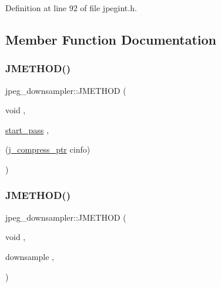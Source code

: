 Definition at line 92 of file jpegint.\+h.



\subsection{Member Function Documentation}
\mbox{\label{structjpeg__downsampler_a1ca33229e63cdb80020c714f1cd28ea0}} 
\subsubsection{\texorpdfstring{JMETHOD()}{JMETHOD()}\hspace{0.1cm}{\footnotesize\ttfamily [1/2]}}
{\footnotesize\ttfamily jpeg\+\_\+downsampler\+::\+J\+M\+E\+T\+H\+OD (\begin{DoxyParamCaption}\item[{void}]{,  }\item[{\mbox{\hyperlink{jddctmgr_8c_a1964f006adb8fb80f57e455f6452aec1}{start\+\_\+pass}}}]{,  }\item[{(\mbox{\hyperlink{jpeglib_8h_add2a072c54e3a51550f4975f7ddb91e7}{j\+\_\+compress\+\_\+ptr}} cinfo)}]{ }\end{DoxyParamCaption})}

\mbox{\label{structjpeg__downsampler_a611ebcb0ae11e4d1c6ba4222caacaec4}} 
\subsubsection{\texorpdfstring{JMETHOD()}{JMETHOD()}\hspace{0.1cm}{\footnotesize\ttfamily [2/2]}}
{\footnotesize\ttfamily jpeg\+\_\+downsampler\+::\+J\+M\+E\+T\+H\+OD (\begin{DoxyParamCaption}\item[{void}]{,  }\item[{downsample}]{,  }\item[{(\mbox{\hyperlink{jpeglib_8h_add2a072c54e3a51550f4975f7ddb91e7}{j\+\_\+compress\+\_\+ptr}} cinfo, \mbox{\hyperlink{jpeglib_8h_a4bf858e4d42202287e786bdec2f3b62b}{J\+S\+A\+M\+P\+I\+M\+A\+GE}} input\+\_\+buf, \mbox{\hyperlink{jmorecfg_8h_a04ed4674f6f1d0d50ec241531e38274f}{J\+D\+I\+M\+E\+N\+S\+I\+ON}} in\+\_\+row\+\_\+index, \mbox{\hyperlink{jpeglib_8h_a4bf858e4d42202287e786bdec2f3b62b}{J\+S\+A\+M\+P\+I\+M\+A\+GE}} \mbox{\hyperlink{jdct_8h_ad7e4660a191b1a791748dd44d5a7a0ec}{output\+\_\+buf}}, \mbox{\hyperlink{jmorecfg_8h_a04ed4674f6f1d0d50ec241531e38274f}{J\+D\+I\+M\+E\+N\+S\+I\+ON}} out\+\_\+row\+\_\+group\+\_\+index)}]{ }\end{DoxyParamCaption})}



